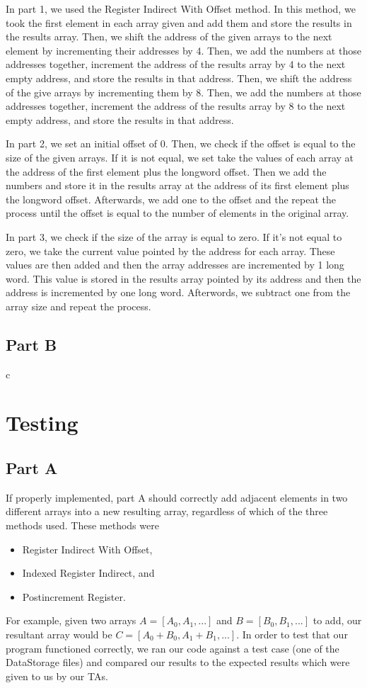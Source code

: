 \documentclass[10pt, letterpaper, titlepage]{article} %
\begin{document}
\begin{multicols*}{2}
In part 1, we used the Register Indirect With Offset method. 
In this method, we took the first element in each array given and add them and store the results in the results array. 
Then, we shift the address of the given arrays to the next element by incrementing their addresses by 4. 
Then, we add the numbers at those addresses together, increment the address of the results array by 4 to the next empty address, and store the results in that address. 
Then, we shift the address of the give arrays by incrementing them by 8. 
Then, we add the numbers at those addresses together, increment the address of the results array by 8 to the next empty address, and store the results in that address.

In part 2, we set an initial offset of 0.
Then, we check if the offset is equal to the size of the given arrays. 
If it is not equal, we set take the values of each array at the address of the first element plus the longword offset. 
Then we add the numbers and store it in the results array at the address of its first element plus the longword offset.
Afterwards, we add one to the offset and the repeat the process until the offset is equal to the number of elements in the original array.

In part 3, we check if the size of the array is equal to zero. 
If it's not equal to zero, we take the current value pointed by the address for each array. 
These values are then added and then the array addresses are incremented by 1 long word. 
This value is stored in the results array pointed by its address and then the address is incremented by one long word.
Afterwords, we subtract one from the array size and repeat the process.

\subsection{Part B}
c

\section{Testing}
\subsection{Part A}
If properly implemented, part A should correctly add adjacent elements in two different arrays into a new resulting array, regardless of which of the three methods used. 
These methods were
\begin{itemize}
	\item Register Indirect With Offset,
	\item Indexed Register Indirect, and
	\item Postincrement Register.
\end{itemize}
For example, given two arrays $A = [A_0, A_1, ...]$ and $B = [B_0, B_1, ...]$ to add, our resultant array would be $C = [A_0 + B_0, A_1 + B_1, ...]$.
In order to test that our program functioned correctly, we ran our code against a test case (one of the DataStorage files) and compared our results to the expected results which were given to us by our TAs. 


\end{multicols*}
\end{document}
